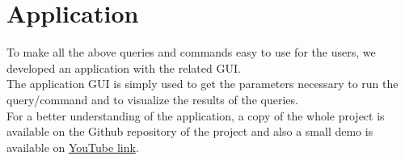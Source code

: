 \documentclass{article}
\begin{document}
						 
						  
						  
						  
		\section{Application}
		To make all the above queries and commands easy to use for the users, we developed an application with the related GUI.\\
		The application GUI is simply used to get the parameters necessary to run the query/command and to visualize the results of the queries.\\
		For a better understanding of the application, a copy of the whole project is available on the Github repository of the project and also a small demo is available on \href{https://youtu.be/C35U8NvhEVM}{YouTube link}.
						
		\pagebreak
						
		\pagebreak
		\clearpage
\end{document}
